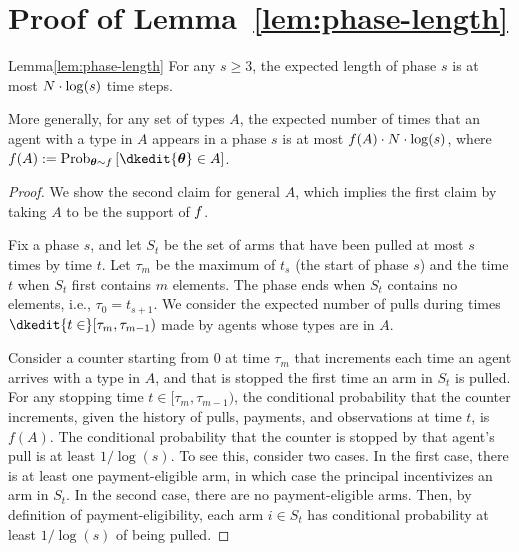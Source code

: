 \section{Proof of Lemma~\ref{lem:phase-length}}
\label{sec:lemma4-proof}

\begin{rlemma}{Lemma}{\ref{lem:phase-length}}
For any $s\geq 3$, the expected length of phase $s$ is at most
$N \cdot \log(s)$ time steps.

More generally, for any set of types $A$, the expected number of times that 
an agent with a type in $A$ appears in a phase $s$ is at most 
$f(A) \cdot N \cdot \log(s)$,
where $f(A) := \Prob[\AgV \sim \AgentDist]{\dkedit{\AgV} \in A}$.
\end{rlemma}

\begin{proof}
We show the second claim for general $A$,
which implies the first claim by taking $A$ to be the support of $f$.

Fix a phase $s$, and let $S_t$ be the set of arms that have been
pulled at most $s$ times by time $t$.
Let $\tau_m$ be the maximum of $t_s$ (the start of phase $s$)
and the time $t$ when $S_t$ first contains  $m$ elements.
The phase ends when $S_t$ contains no elements, i.e., $\tau_0 = t_{s+1}$.
We consider the expected number of pulls during times
$\dkedit{t \in} [\tau_m, \tau_{m-1})$ made by agents whose types are in $A$. 

Consider a counter starting from $0$ at time $\tau_m$ that increments
each time an agent arrives with a type in $A$,
and that is stopped the first time an arm in $S_t$ is pulled.
For any stopping time $t \in [\tau_m, \tau_{m-1})$, 
the conditional probability that the counter increments,
given the history of pulls, payments, and observations at time $t$,
is $f(A)$.
The conditional probability that the counter is stopped by that
agent's pull is at least $1/\log(s)$.
To see this, consider two cases.
In the first case, there is at least one payment-eligible arm,
in which case the principal incentivizes an arm in $S_t$.
In the second case, there are no payment-eligible arms.
Then, by definition of payment-eligibility,
each arm $i \in S_t$ has conditional probability at least $1/\log(s)$ of being pulled.


\end{proof}
